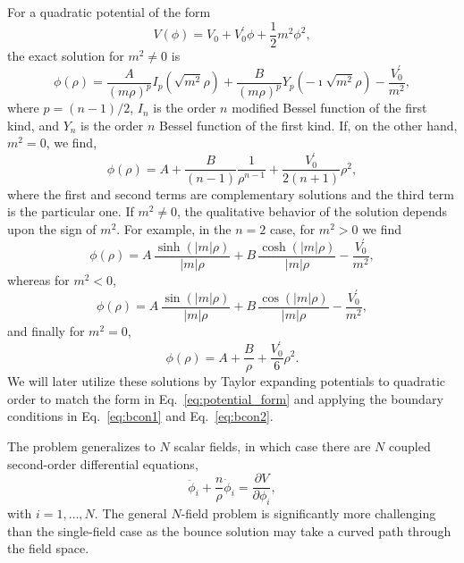 \documentclass[final,3p,11pt,pdflatex]{elsarticle}
\renewcommand{\tfrac}{\frac}
\renewcommand{\refeq}[1]{Eq.~\ref{#1}}
\begin{document}
For a quadratic potential of the form
\begin{equation}\label{eq:potential_form}
V(\phi) = V^{\phantom\prime}_0 + V^\prime_0 \phi + \tfrac{1}{2} m^2 \phi^2,
\end{equation}
the exact solution for $m^2 \neq 0$ is
\begin{equation}\label{eq:sol}
\phi(\rho) =  \frac{A}{(m \rho)^p} I_p\left(\sqrt{m^2} \rho\right) + \frac{B}{(m \rho)^p} Y_p \left(-\imath \sqrt{m^2} \rho\right) -\frac{V^\prime_0}{m^2},
\end{equation}
where $p = (n-1)/2$, $I_n$ is the order $n$ modified Bessel function of the first kind, and $Y_n$ is the order $n$ Bessel function of the first kind.  If, on the other hand, $m^2 = 0$, we find,
\begin{equation}
\phi(\rho) = A + \frac{B}{(n-1)} \frac{1}{\rho^{n - 1}}+ \frac{V^\prime_0}{2 (n + 1)} \rho^2 ,
\end{equation}
where the first and second terms are complementary solutions and the third term is the particular one.  If $m^2 \neq 0$, the qualitative behavior of the solution depends upon the sign of $m^2$.  For example, in the $n=2$ case, for $m^2 > 0$ we find
\begin{equation}\label{eq:gt}
\phi(\rho) = A\, \frac{\sinh\left(|m| \rho\right)}{|m|\rho} + B\, \frac{\cosh\left(|m| \rho\right)}{|m|\rho} - \frac{V^\prime_0}{m^2},
\end{equation}
whereas for $m^2 < 0$,
\begin{equation}\label{eq:lt}
\phi(\rho) = A\, \frac{\sin\left(|m| \rho\right)}{|m| \rho} + B\, \frac{\cos\left(|m| \rho\right)}{|m| \rho} - \frac{V^\prime_0}{m^2},
\end{equation}
and finally for $m^2 = 0$,
\begin{equation}\label{eq:zero}
\phi(\rho) = A + \frac{B}{\rho} + \frac{V^\prime_0}{6} \rho^2.
\end{equation}
We will later utilize these solutions by Taylor expanding potentials to quadratic order to match the form in \refeq{eq:potential_form} and applying the boundary conditions in \refeq{eq:bcon1} and \refeq{eq:bcon2}.

The problem generalizes to $N$ scalar fields, in which case there are $N$
coupled second-order differential equations,
\begin{equation}\label{eq:n_dim_bounce}
\ddot \phi_i + \tfrac{n}{\rho}\dot\phi_i = \frac{\partial V}{\partial \phi_i},
\end{equation}
with $i=1,\ldots, N$.  The general $N$-field problem is significantly more challenging than the single-field case as the bounce solution may take a curved path through the field space.
\end{document}
